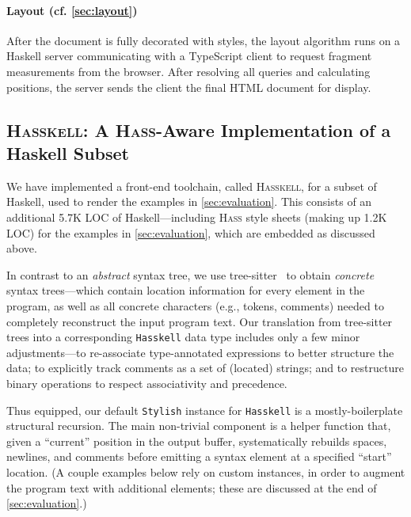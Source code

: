 \documentclass[acmsmall, screen]{acmart}
\newcommand{\parahead}[1]
  {\paragraph{\textbf{#1}}}
\newcommand{\hass}
{\textsc{Hass}}
\newcommand{\hasskell}
{\textsc{Hasskell}}
\begin{document}
\parahead{Layout (cf. \autoref{sec:layout})}


After the document is fully decorated with styles, the layout algorithm runs on a Haskell server communicating with a TypeScript client to request fragment measurements from the browser.
After resolving all queries and calculating positions, the server sends the client the final HTML document for display.









\subsection{\hasskell{}: A \hass{}-Aware Implementation of a Haskell Subset}
\label{sec:hasskell}

We have implemented a front-end toolchain, called \hasskell{}, for a subset of Haskell, used to render the examples in \autoref{sec:evaluation}.
This consists of an additional 5.7K LOC of Haskell---including \hass{} style sheets (making up 1.2K LOC) for the examples in \autoref{sec:evaluation}, which are embedded as discussed above.






In contrast to an \emph{abstract} syntax tree, we use tree-sitter~\cite{tree-sitter, tree-sitter-haskell, haskell-tree-sitter} to obtain \emph{concrete} syntax trees---which contain location information for every element in the program, as well as all concrete characters (e.g., tokens, comments) needed to completely reconstruct the input program text.
Our translation from tree-sitter trees into a corresponding \texttt{Hasskell} data type includes only a few minor adjustments---to re-associate type-annotated expressions to better structure the data;
to explicitly track comments as a set of (located) strings; and
to restructure binary operations to respect associativity and precedence.



Thus equipped, our default \texttt{Stylish} instance for \texttt{Hasskell} is a mostly-boilerplate structural recursion.
The main non-trivial component is a helper function that, given a ``current'' position in the output buffer, systematically rebuilds spaces, newlines, and comments before emitting a syntax element at a specified ``start'' location.
(A couple examples below rely on custom instances, in order to augment the program text with additional elements; these are discussed at the end of \autoref{sec:evaluation}.)
\end{document}
